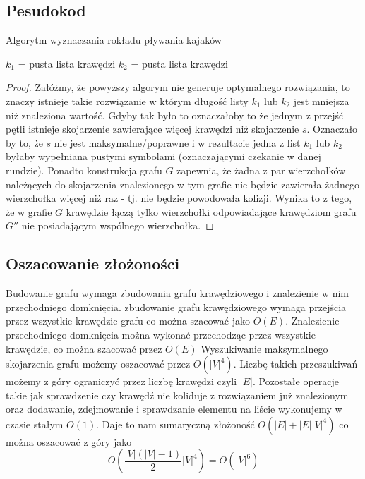 \documentclass{llncs}
\begin{document}
\subsection{Pesudokod}
\begin{algorithm}[H]
 \caption{Algorytm wyznaczania rokładu pływania kajaków}
 $k_1$ = pusta lista krawędzi\;
 $k_2$ = pusta lista krawędzi\;
\end{algorithm}

\begin{proof}
Załóżmy, że powyższy algorym nie generuje optymalnego rozwiązania, to znaczy istnieje
takie rozwiązanie w którym długość listy $k_1$ lub $k_2$ jest mniejsza niż znaleziona wartość.
Gdyby tak było to oznaczałoby to że jednym z przejść pętli istnieje
skojarzenie zawierające więcej krawędzi niż skojarzenie $s$. 
Oznaczało by to, że $s$ nie jest maksymalne/poprawne i w rezultacie jedna z list $k_1$ lub $k_2$ byłaby wypełniana pustymi
symbolami (oznaczającymi czekanie w danej rundzie). Ponadto konstrukcja grafu $G$ zapewnia, że żadna z par wierzchołków należących do skojarzenia znalezionego w tym grafie nie będzie zawierała żadnego wierzchołka więcej niż raz - tj. nie będzie powodowała kolizji. Wynika to z tego, że w grafie $G$ krawędzie łączą tylko wierzchołki odpowiadające krawędziom grafu $G''$ nie posiadającym wspólnego wierzchołka.
\end{proof}

\subsection{Oszacowanie złożoności}
Budowanie grafu wymaga zbudowania grafu krawędziowego i znalezienie w nim przechodniego domknięcia. zbudowanie grafu krawędziowego
wymaga przejścia przez wszystkie krawędzie grafu co można 
szacować jako $O(E)$. Znalezienie przechodniego domknięcia
można wykonać przechodząc przez wszystkie krawędzie, 
co można szacować przez $O(E)$
Wyszukiwanie maksymalnego skojarzenia grafu możemy oszacować przez $O(|V|^4)$\cite{wiki-blossom}.
Liczbę takich przeszukiwań możemy z góry ograniczyć przez liczbę krawędzi czyli $|E|$. 
Pozostałe operacje takie jak sprawdzenie czy krawędź nie koliduje z rozwiązaniem już znalezionym
oraz dodawanie, zdejmowanie i sprawdzanie elementu na liście wykonujemy w czasie stałym $O(1)$.
Daje to nam sumaryczną złożoność $O(|E|+|E||V|^4)$ co można oszacować z góry jako 
\begin{equation}
O(\frac{|V|(|V|-1)}{2} |V|^4) = O(|V|^6)
\end{equation}
\end{document}
